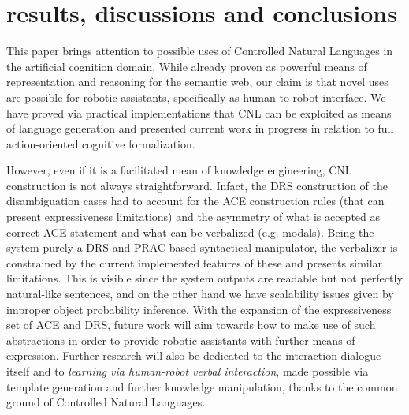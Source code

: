 \documentclass[oribibl]{llncs}
\begin{document}
\section{results, discussions and conclusions}
This paper brings attention to possible uses of Controlled Natural Languages in the artificial cognition domain. While already proven as powerful means of representation and reasoning for the semantic web\cite{kuhnkaljurandsemantic}, our claim is that novel uses are possible for robotic assistants, specifically as human-to-robot interface.
We have proved via practical implementations that CNL can be exploited as means of language generation and presented current work in progress in relation to full action-oriented cognitive formalization.

However, even if it is a facilitated mean of knowledge engineering, CNL construction is not always straightforward\cite{Schwitter05alayered}. Infact, the DRS construction of the disambiguation cases had to account for the ACE construction rules (that can present expressiveness limitations) and the asymmetry of what is accepted as correct ACE statement and what can be verbalized (e.g. modals). Being the system purely a DRS and PRAC based syntactical manipulator, the verbalizer is constrained by the current implemented features of these and presents similar limitations. This is visible since the system outputs are readable but not perfectly natural-like sentences, and on the other hand we have scalability issues given by improper object probability inference.
With the expansion of the expressiveness set of ACE and DRS, future work will aim towards how to make use of such abstractions in order to provide robotic assistants with further means of expression.
Further research will also be dedicated to the interaction dialogue itself and to \textit{learning via human-robot verbal interaction}, made possible via template generation and further knowledge manipulation, thanks to the common ground of Controlled Natural Languages.

%
{}

%
\end{document}
